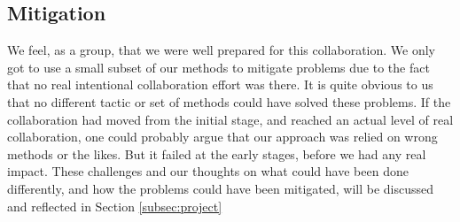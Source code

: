\subsection{Mitigation} \label{sec:mitigation}
We feel, as a group, that we were well prepared for this collaboration. We only got to use a small subset of our methods to mitigate problems due to the fact that no real intentional collaboration effort was there. It is quite obvious to us that no different tactic or set of methods could have solved these problems. If the collaboration had moved from the initial stage, and reached an actual level of real collaboration, one could probably argue that our approach was relied on wrong methods or the likes. But it failed at the early stages, before we had any real impact. These challenges and our thoughts on what could have been done differently, and how the problems could have been mitigated, will be discussed and reflected in Section \ref{subsec:project}